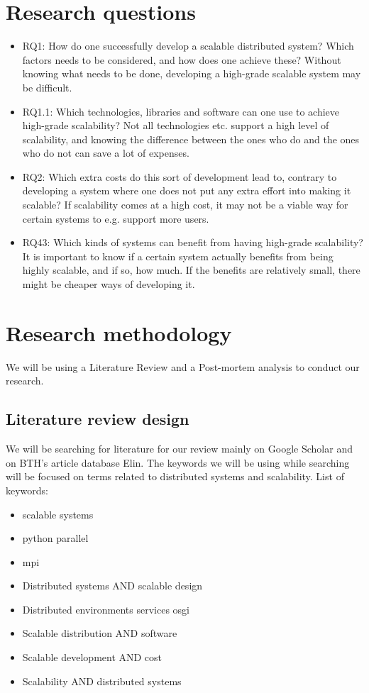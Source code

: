 \documentclass{article}
\begin{document}
\section{Research questions}
\begin{itemize}
\item{RQ1: How do one successfully develop a scalable distributed system? Which
factors needs to be considered, and how does one achieve these? Without knowing
what needs to be done, developing a high-grade scalable system may be
difficult.} 

\item{RQ1.1: Which technologies, libraries and software can one use to achieve
high-grade scalability? Not all technologies etc. support a high level of
scalability, and knowing the difference between the ones who do and the ones
who do not can save a lot of expenses.}

\item{RQ2: Which extra costs do this sort of development lead to, contrary to
developing a system where one does not put any extra effort into making it
scalable? If scalability comes at a high cost, it may not be a viable way for
certain systems to e.g. support more users.} 

\item{RQ43: Which kinds of systems can benefit from having high-grade scalability? It
is important to know if a certain system actually benefits from being highly
scalable, and if so, how much. If the benefits are relatively small, there 
might be cheaper ways of developing it.}
\end{itemize}

\section{Research methodology}
We will be using a Literature Review and a Post-mortem analysis to conduct our 
research. 

\subsection{Literature review design}
We will be searching for literature for our review mainly on Google Scholar and
on BTH's article database Elin. The keywords we will be using while searching 
will be focused on terms related to distributed systems and scalability.
\newline
List of keywords:
\begin{itemize}
\item{scalable systems}
\item{python parallel}
\item{mpi}
\item{Distributed systems AND scalable design}
\item{Distributed environments services osgi}
\item{Scalable distribution AND software}
\item{Scalable development AND cost}
\item{Scalability AND distributed systems}
\end{itemize}
\end{document}
